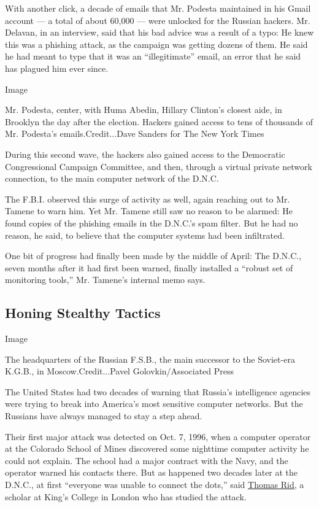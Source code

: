 With another click, a decade of emails that Mr. Podesta maintained in
his Gmail account --- a total of about 60,000 --- were unlocked for the
Russian hackers. Mr. Delavan, in an interview, said that his bad advice
was a result of a typo: He knew this was a phishing attack, as the
campaign was getting dozens of them. He said he had meant to type that
it was an ``illegitimate'' email, an error that he said has plagued him
ever since.

Image

Mr. Podesta, center, with Huma Abedin, Hillary Clinton's closest aide,
in Brooklyn the day after the election. Hackers gained access to tens of
thousands of Mr. Podesta's emails.Credit...Dave Sanders for The New York
Times

During this second wave, the hackers also gained access to the
Democratic Congressional Campaign Committee, and then, through a virtual
private network connection, to the main computer network of the D.N.C.

The F.B.I. observed this surge of activity as well, again reaching out
to Mr. Tamene to warn him. Yet Mr. Tamene still saw no reason to be
alarmed: He found copies of the phishing emails in the D.N.C.'s spam
filter. But he had no reason, he said, to believe that the computer
systems had been infiltrated.

One bit of progress had finally been made by the middle of April: The
D.N.C., seven months after it had first been warned, finally installed a
``robust set of monitoring tools,'' Mr. Tamene's internal memo says.

\hypertarget{honing-stealthy-tactics}{%
\subsection{Honing Stealthy Tactics}\label{honing-stealthy-tactics}}

Image

The headquarters of the Russian F.S.B., the main successor to the
Soviet-era K.G.B., in Moscow.Credit...Pavel Golovkin/Associated Press

The United States had two decades of warning that Russia's intelligence
agencies were trying to break into America's most sensitive computer
networks. But the Russians have always managed to stay a step ahead.

Their first major attack was detected on Oct. 7, 1996, when a computer
operator at the Colorado School of Mines discovered some nighttime
computer activity he could not explain. The school had a major contract
with the Navy, and the operator warned his contacts there. But as
happened two decades later at the D.N.C., at first ``everyone was unable
to connect the dots,'' said
\href{http://www.kcl.ac.uk/sspp/departments/warstudies/people/professors/rid.aspx}{Thomas
Rid}, a scholar at King's College in London who has studied the attack.

